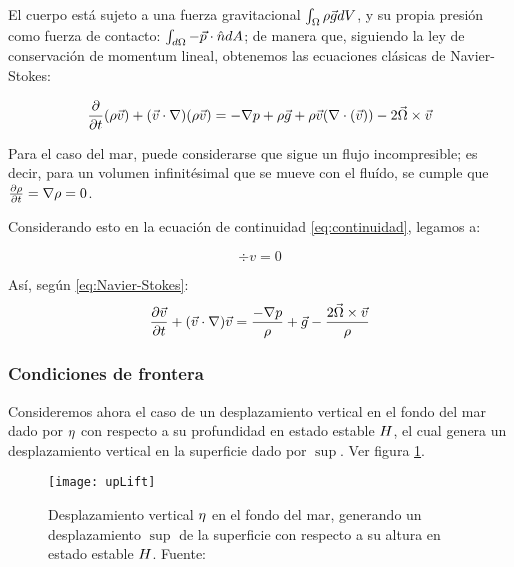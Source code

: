 El cuerpo está sujeto a una fuerza gravitacional $\int_{\Omega} \rho \vec{g} dV$, y su propia presión como fuerza de contacto: $\int_{d\Omega} -\vec{p} \cdot \hat{n} dA$; de manera que, siguiendo la ley de conservación de momentum lineal, obtenemos las ecuaciones clásicas de Navier-Stokes: 

\begin{equation}
  \label{eq:Navier-Stokes}
  \frac{\partial }{\partial t} (\rho \vec{v}) +(\vec{v}\cdot\nabla)(\rho\vec{v}) = -\nabla p + \rho \vec{g} + \rho \vec{v} (\nabla \cdot \left( \vec{v} \right)) - 2 \vec{\Omega} \times \vec{v}
\end{equation}

Para el caso del mar, puede considerarse que sigue un flujo incompresible; es decir, para un volumen infinitésimal que se mueve con el fluído, se cumple que $\frac{\partial \rho}{\partial t} = \nabla \rho =  0$.

Considerando esto en la ecuación de continuidad \eqref{eq:continuidad}, legamos a:

\begin{equation}
  \label{eq:divV}
  \div{v}=0  
\end{equation}


Así, según \eqref{eq:Navier-Stokes}:
\begin{equation}
  \label{eq:Navier-Stokes2}
  \frac{\partial \vec{v}}{\partial t} + (\vec{v}\cdot\nabla)\vec{v} = \frac{-\nabla p}{\rho} + \vec{g} - \frac{2 \vec{\Omega} \times \vec{v}}{\rho}
\end{equation}

\subsubsection{Condiciones de frontera}
\label{sec:condiciones-frontera}

Consideremos ahora el caso de un desplazamiento vertical en el fondo del mar dado por $\eta$ con respecto a su profundidad en estado estable $H$, el cual genera un desplazamiento vertical en la superficie dado por $\sup$. Ver figura \ref{fig:upLift}.

\begin{figure}
  \centering
  \texttt{[image: upLift]}
  \caption{Desplazamiento vertical $\eta$ en el fondo del mar, generando un desplazamiento $\sup$ de la superficie con respecto a su altura en estado estable $H$. Fuente: \cite{Levin2016}}
  \label{fig:upLift}
\end{figure}

